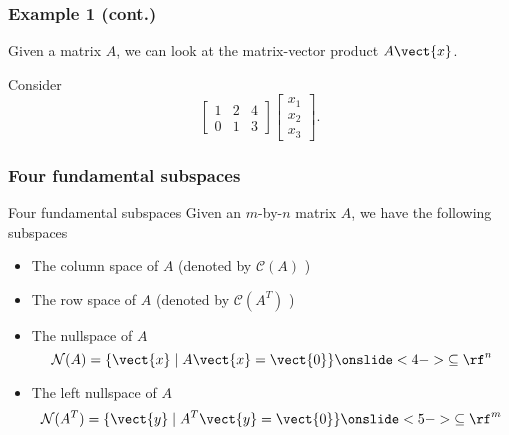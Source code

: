\begin{frame}
  \frametitle{Example 1 (cont.)}

  Given a matrix $A$, we can look at the matrix-vector product $A\vect{x}$.

  Consider
  \[
  \begin{bmatrix}
    1 & 2 & 4 \\
    0 & 1 & 3
  \end{bmatrix}
  \begin{bmatrix}
    x_1\\ x_2 \\x_3
  \end{bmatrix}.
  \]

  \vspace{2in}
\end{frame}

\begin{frame}
  \frametitle{Four fundamental subspaces}

  \begin{block}{Four fundamental subspaces}
    Given an $m$-by-$n$ matrix $A$, we have the following subspaces
    \begin{itemize}
    \item The column space of $A$ (denoted by ${\mathcal C}(A)$
      )
    \item The row space of $A$ (denoted by ${\mathcal C}(A^T)$
      )
    \item The nullspace of $A$
      \[
        {\mathcal N}(A) = \{\vect{x} \;|\; A\vect{x}=\vect{0}\}
        \onslide<4->{\subseteq \rf^n}
      \]
    \item The left nullspace of $A$
      \[
        {\mathcal N}(A^T) = \{\vect{y} \;|\; A^T\vect{y}=\vect{0}\}
        \onslide<5->{\subseteq \rf^m}
      \]
    \end{itemize}
  \end{block}
\end{frame}


